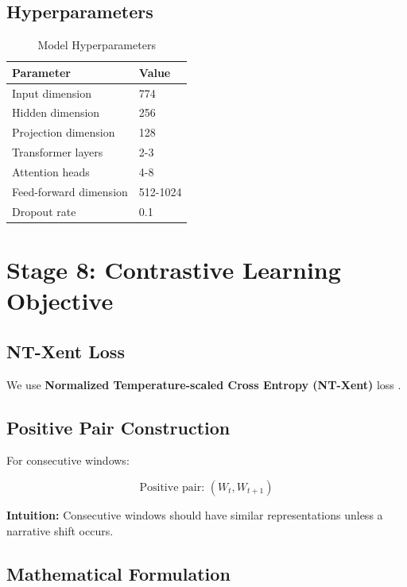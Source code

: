 \documentclass[12pt]{article}
\begin{document}
\subsection{Hyperparameters}

\begin{table}[H]
\centering
\begin{tabular}{ll}
\toprule
\textbf{Parameter} & \textbf{Value} \\
\midrule
Input dimension & 774 \\
Hidden dimension & 256 \\
Projection dimension & 128 \\
Transformer layers & 2-3 \\
Attention heads & 4-8 \\
Feed-forward dimension & 512-1024 \\
Dropout rate & 0.1 \\
\bottomrule
\end{tabular}
\caption{Model Hyperparameters}
\end{table}

\newpage

\section{Stage 8: Contrastive Learning Objective}

\subsection{NT-Xent Loss}

We use \textbf{Normalized Temperature-scaled Cross Entropy (NT-Xent)} loss \citep{chen2020simple}.

\subsection{Positive Pair Construction}

For consecutive windows:

\begin{equation}
\text{Positive pair: } (W_t, W_{t+1})
\end{equation}

\textbf{Intuition:} Consecutive windows should have similar representations unless a narrative shift occurs.

\subsection{Mathematical Formulation}
\end{document}
